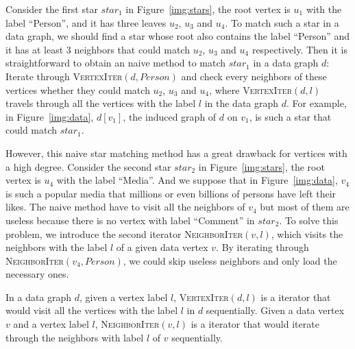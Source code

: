 Consider the first star $star_1$ in Figure~\ref{img:stars}, the root vertex is $u_1$ with the label ``Person'',
and it has three leaves $u_2$, $u_3$ and $u_4$.
To match such a star in a data graph, we should find a star whose root also contains the label ``Person''
and it has at least 3 neighbors that could match $u_2$, $u_3$ and $u_4$ respectively.
Then it is straightforward to obtain an naive method to match $star_1$ in a data graph $d$:
Iterate through \textsc{VertexIter}$(d, Person)$ and check every neighbors of these vertices whether they could match $u_2$, $u_3$ and $u_4$, where \textsc{VertexIter}$(d, l)$ travels through all the vertices with the label $l$ in the data graph $d$.
For example, in Figure~\ref{img:data}, $d[v_1]$, the induced graph of $d$ on $v_1$, is such a star that could match $star_1$.

However, this naive star matching method has a great drawback for vertices with a high degree.
Consider the second star $star_2$ in Figure~\ref{img:stars}, the root vertex is $u_4$ with the label ``Media''.
And we suppose that in Figure~\ref{img:data}, $v_4$ is such a popular media that millions or even billions of persons have left their likes.
The naive method have to visit all the neighbors of $v_4$ but most of them are useless because there is no vertex with label ``Comment'' in $star_2$.
To solve this problem, we introduce the second iterator \textsc{NeighborIter}$(v, l)$,
which visits the neighbors with the label $l$ of a given data vertex $v$.
By iterating through \textsc{NeighborIter}$(v_4, Person)$, we could skip useless neighbors and only load the necessary ones.

\begin{definition}
  In a data graph $d$, given a vertex label $l$, \textsc{VertexIter}$(d, l)$ is a iterator that would visit all the vertices with the label $l$ in $d$ sequentially.
  Given a data vertex $v$ and a vertex label $l$, \textsc{NeighborIter}$(v, l)$ is a iterator that would iterate through the neighbors with label $l$ of $v$ sequentially.
\end{definition}


